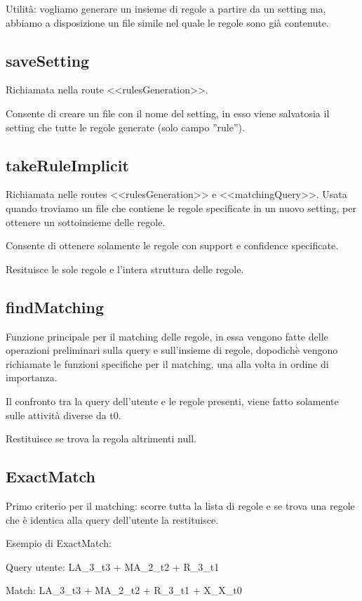 \documentclass[a4paper]{article}
\begin{document}
Utilità: vogliamo generare un insieme di regole a partire da un setting ma, abbiamo a disposizione un file simile nel quale le regole sono già contenute.

\subsection{saveSetting}
Richiamata nella route <<rulesGeneration>>.

Consente di creare un file con il nome del setting, in esso viene salvatosia il setting che tutte le regole generate (solo campo ''rule'').

\subsection{takeRuleImplicit}
Richiamata nelle routes <<rulesGeneration>> e <<matchingQuery>>. Usata quando troviamo un file che contiene le regole specificate in un nuovo setting, per ottenere un sottoinsieme delle regole.

Consente di ottenere solamente le regole con support e confidence specificate.

Resituisce le sole regole e l'intera struttura delle regole.

\subsection{findMatching}
Funzione principale per il matching delle regole, in essa vengono fatte delle operazioni preliminari sulla query e sull'insieme di regole, dopodichè vengono richiamate le funzioni specifiche per il matching, una alla volta in ordine di importanza.

Il confronto tra la query dell'utente e le regole presenti, viene fatto solamente sulle attività diverse da t0.

Restituisce se trova la regola altrimenti null.

\subsection{ExactMatch}
Primo criterio per il matching: scorre tutta la lista di regole e se trova una regole che è identica alla query dell'utente la restituisce. 

Esempio di ExactMatch: 

Query utente: LA\_3\_t3 + MA\_2\_t2 + R\_3\_t1

Match: LA\_3\_t3 + MA\_2\_t2 + R\_3\_t1 + X\_X\_t0
\end{document}
